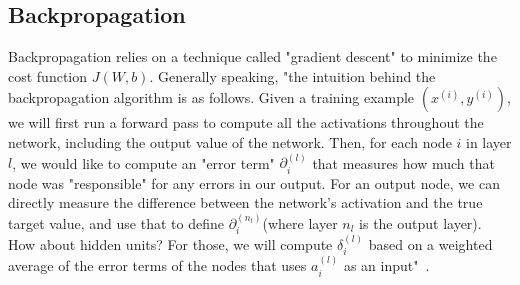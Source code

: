 \subsection{Backpropagation}

\setlength{\marginparwidth}{3cm}\leavevmode {}Backpropagation relies on a technique called "gradient descent" to minimize the cost function $J(W, b)$. Generally speaking, "the intuition behind the backpropagation algorithm is as follows. Given a training example $(x^{(i)}, y^{(i)})$, we will first run a forward pass to compute all the activations throughout the network, including the output value of the network. Then, for each node $i$ in layer $l$, we would like to compute an "error term" $\partial^{(l)}_{i}$ that measures how much that node was "responsible" for any errors in our output. For an output node, we can directly measure the difference between the network’s activation and the true target value, and use that to define $\partial^{(n_{l})}_{i}$(where layer $n_{l}$ is the output layer). How about hidden units? For those, we will compute $\delta^{(l)}_{i}$ based on a weighted average of the error terms of the nodes that uses $a^{(l)}_{i}$ as an input"~\cite{24}.


